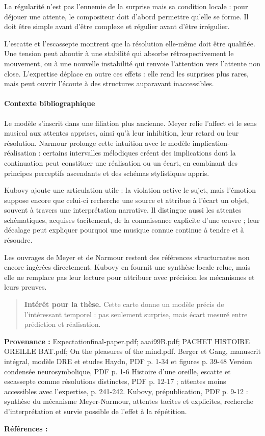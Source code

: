 \documentclass[10pt,a4paper]{article}
\begin{document}
La régularité n'est pas l'ennemie de la surprise mais sa condition locale : pour déjouer une attente, le compositeur doit d'abord permettre qu'elle se forme. Il doit être simple avant d'être complexe et régulier avant d'être irrégulier.

L'escatte et l'escassepte montrent que la résolution elle-même doit être qualifiée. Une tension peut aboutir à une stabilité qui absorbe rétrospectivement le mouvement, ou à une nouvelle instabilité qui renvoie l'attention vers l'attente non close. L'expertise déplace en outre ces effets : elle rend les surprises plus rares, mais peut ouvrir l'écoute à des structures auparavant inaccessibles.

\paragraph{Contexte bibliographique}
Le modèle s'inscrit dans une filiation plus ancienne. Meyer relie l'affect et le sens musical aux attentes apprises, ainsi qu'à leur inhibition, leur retard ou leur résolution. Narmour prolonge cette intuition avec le modèle implication-réalisation : certains intervalles mélodiques créent des implications dont la continuation peut constituer une réalisation ou un écart, en combinant des principes perceptifs ascendants et des schémas stylistiques appris.

Kubovy ajoute une articulation utile : la violation active le sujet, mais l'émotion suppose encore que celui-ci recherche une source et attribue à l'écart un objet, souvent à travers une interprétation narrative. Il distingue aussi les attentes schématiques, acquises tacitement, de la connaissance explicite d'une œuvre ; leur décalage peut expliquer pourquoi une musique connue continue à tendre et à résoudre.

Les ouvrages de Meyer et de Narmour restent des références structurantes non encore ingérées directement. Kubovy en fournit une synthèse locale relue, mais elle ne remplace pas leur lecture pour attribuer avec précision les mécanismes et leurs preuves.

\begin{quote}
\textbf{Intérêt pour la thèse.} Cette carte donne un modèle précis de l'intéressant temporel : pas seulement surprise, mais écart mesuré entre prédiction et réalisation.
\end{quote}
{\footnotesize\color{metadata}\textbf{Provenance :} Expectationfinal-paper.pdf; aaai99B.pdf; PACHET HISTOIRE OREILLE BAT.pdf; On the pleasures of the mind.pdf. Berger et Gang, manuscrit intégral, modèle DRE et etudes Haydn, PDF p. 1-34 et figures p. 39-48 Version condensée neurosymbolique, PDF p. 1-6 Histoire d'une oreille, escatte et escassepte comme résolutions distinctes, PDF p. 12-17 ; attentes moins accessibles avec l'expertise, p. 241-242. Kubovy, prépublication, PDF p. 9-12 : synthèse du mécanisme Meyer-Narmour, attentes tacites et explicites, recherche d'interprétation et survie possible de l'effet à la répétition.\par}
{\footnotesize\color{metadata}\textbf{Références :} \parencite{berger1999expectations,gang1999unified,meyer1956emotion,narmour1990basic,narmour1992complexity,pachet2018oreille,kubovy1999pleasures}\par}
\end{document}
